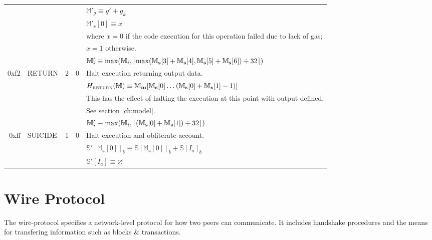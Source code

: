 \documentclass[9pt,oneside]{amsart}
\DeclarePairedDelimiter{\ceil}{\lceil}{\rceil}
\begin{document}
\begin{tabular*}{\columnwidth}[h]{rlrrl}
&&&& $\mathbb{M}'_g \equiv g' + g_k$ \\
&&&& $\mathbb{M}'_\mathbf{s}[0] \equiv x$ \\
&&&& where $x=0$ if the code execution for this operation failed due to lack of gas;\\
&&&& $x=1$ otherwise. \\
&&&& $\mathbb{M}'_i \equiv \max(\mathbb{M}_i, \ceil{ \max(\mathbb{M}_\mathbf{s}[3] + \mathbb{M}_\mathbf{s}[4], \mathbb{M}_\mathbf{s}[5] + \mathbb{M}_\mathbf{s}[6]) \div 32 })$ \\
\midrule
0xf2 & {\small RETURN} & 2 & 0 & Halt execution returning output data. \\
&&&& $H_{\text{\tiny RETURN}}(\mathbb{M}) \equiv \mathbb{M}_\mathbf{m}[ \mathbb{M}_\mathbf{s}[0] \dots ( \mathbb{M}_\mathbf{s}[0] + \mathbb{M}_\mathbf{s}[1] - 1 ) ]$ \\
&&&& This has the effect of halting the execution at this point with output defined.\\
&&&& See section \ref{ch:model}. \\
&&&& $\mathbb{M}'_i \equiv \max(\mathbb{M}_i, \ceil{ (\mathbb{M}_\mathbf{s}[0] + \mathbb{M}_\mathbf{s}[1]) \div 32 })$ \\
\midrule
0xff & {\small SUICIDE} & 1 & 0 & Halt execution and obliterate account. \\
&&&& $\mathbb{S}'[\mathbb{M}_\mathbf{s}[0]]_b \equiv \mathbb{S}[\mathbb{M}_\mathbf{s}[0]]_b + \mathbb{S}[I_a]_b$ \\
&&&& $\mathbb{S}'[I_a] \equiv \varnothing$ \\
\bottomrule
\end{tabular*}


\section{Wire Protocol}\label{app:wire}
The wire-protocol specifies a network-level protocol for how two peers can communicate. It includes handshake procedures and the means for transfering information such as blocks \& transactions.
\end{document}
